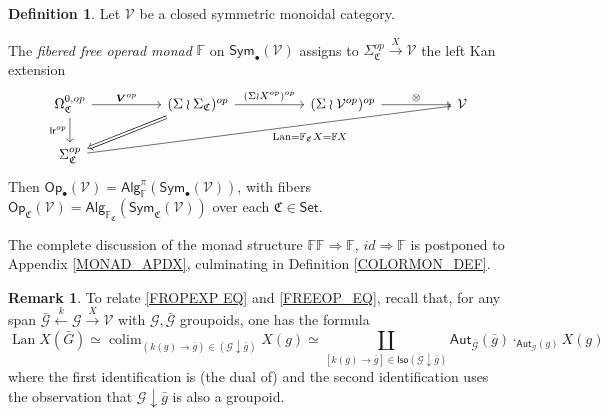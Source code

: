\documentclass[a4paper,10pt
]{article}%
\numberwithin{equation}{section}
\numberwithin{figure}{section}
\theoremstyle{definition} %
\newtheorem{definition}[equation]{Definition}%
\newtheorem{remark}[equation]{Remark}%
\newcommand{\Sym}{\ensuremath{\mathsf{Sym}}}%
\newcommand{\Set}{\ensuremath{\mathsf{Set}}}
\newcommand{\Op}{\mathsf{Op}}%
\newcommand{\Alg}{\mathsf{Alg}}
\DeclareMathOperator{\colim}{colim}%
\DeclareMathOperator{\Lan}{Lan}%
\newcommand{\V}{\ensuremath{\mathcal V}}
\newcommand{\1}{\ensuremath{\mathbbm 1}}%
\begin{document}
\begin{definition}\label{FREEOP DEF}
	Let $\mathcal{V}$ be a closed symmetric monoidal category.
	
	The \textit{fibered free operad monad} $\mathbb{F}$ on $\mathsf{Sym}_\bullet(\mathcal{V})$ 
	assigns to 
	$\Sigma_{\mathfrak{C}}^{op} \xrightarrow{X} \mathcal{V}$
	the left Kan extension
	\begin{equation}\label{FREEOP_EQ}
                \begin{tikzcd}[column sep = 50pt]
                        \Omega^{0,op}_{\mathfrak{C}}
                        \arrow[d, "\mathsf{lr}^{op}"']
                        \arrow[r, "\boldsymbol{V}^{op}"]
                        &
                        (\Sigma \wr \Sigma_{\mathfrak{C}})^{op} \arrow[r, "(\Sigma \wr X^{op})^{op}"]
                        \arrow[dl, Rightarrow]
                        &
                        (\Sigma \wr \V^{op})^{op} \arrow[r, "\otimes"]
                        &
                        \V
                        \\
                        \Sigma^{op}_{\mathfrak{C}}
                        \arrow[urrr, "\Lan = \mathbb F_{\mathfrak{C}} X = \mathbb F X"']
                \end{tikzcd}
        \end{equation}
        Then $\Op_\bullet(\V) = \Alg^\pi_{\mathbb F}(\Sym_\bullet(\V))$,
        with fibers $\Op_{\mathfrak C}(\V) = \Alg_{\mathbb F_{\mathfrak C}}(\Sym_{\mathfrak C}(\V))$ over each $\mathfrak C \in \Set$. %
\end{definition}
The complete discussion of the monad structure
$\mathbb{F}\mathbb{F} \Rightarrow \mathbb{F}$,
$id \Rightarrow \mathbb{F}$ is postponed to Appendix \ref{MONAD_APDX},
culminating in Definition \ref{COLORMON_DEF}.


\begin{remark}\label{CONVER REM}
	To relate \eqref{FROPEXP EQ} and \eqref{FREEOP_EQ}, recall that, 
	for any span 
	$\bar{\mathcal{G}} \overset{k}{\leftarrow} \mathcal{G} \xrightarrow{X} \mathcal{V}$
	with $\mathcal{G},\bar{\mathcal{G}}$ groupoids,
	one has the formula
	\[\Lan X (\bar{G}) \simeq 
	\colim_{(k(g) \to \bar{g})\in (\mathcal{G} \downarrow \bar{g})} X(g) \simeq
	\coprod_{[k(g) \to \bar{g}] 
		\in \mathsf{Iso}(\mathcal{G} \downarrow \bar{g})}
	\mathsf{Aut}_{\bar{\mathcal{G}}}(\bar{g})
	\cdot_{\mathsf{Aut}_{\mathcal{G}}(g)}
	X(g)
	\]
	where the first identification is
	(the dual of) \cite[Thm. 1.3.5]{Ri14}
	and the second identification uses the observation that
	$\mathcal{G} \downarrow \bar{g}$ is also a groupoid.
\end{remark}
\end{document}
